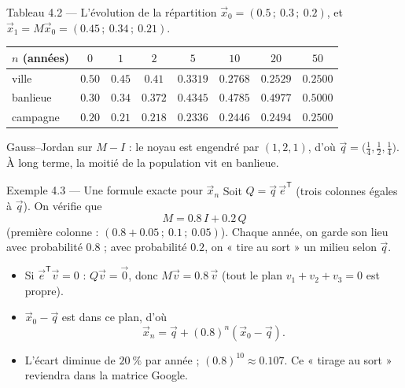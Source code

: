\begin{frame}{Tableau 4.2 --- L'évolution de la répartition}
  \small $\vec x_0=(\num{0.5}\,;\ \num{0.3}\,;\ \num{0.2})$, et
  $\vec x_1=M\vec x_0=(\num{0.45}\,;\ \num{0.34}\,;\ \num{0.21})$.
  \begin{center}
  \footnotesize
  \begin{tabular}{lccccccc}
    \toprule
    $n$ (années) & $0$ & $1$ & $2$ & $5$ & $10$ & $20$ & $50$ \\
    \midrule
    ville & $\num{0.50}$ & $\num{0.45}$ & $\num{0.41}$ & $\num{0.3319}$ & $\num{0.2768}$ & $\num{0.2529}$ & $\num{0.2500}$ \\
    banlieue & $\num{0.30}$ & $\num{0.34}$ & $\num{0.372}$ & $\num{0.4345}$ & $\num{0.4785}$ & $\num{0.4977}$ & $\num{0.5000}$ \\
    campagne & $\num{0.20}$ & $\num{0.21}$ & $\num{0.218}$ & $\num{0.2336}$ & $\num{0.2446}$ & $\num{0.2494}$ & $\num{0.2500}$ \\
    \bottomrule
  \end{tabular}
  \end{center}
  \small Gauss--Jordan sur $M-I$ : le noyau est engendré par $(1,2,1)$,
  d'où $\vec q=\big(\tfrac14,\tfrac12,\tfrac14\big)$. À long terme, la
  moitié de la population vit en banlieue.
\end{frame}

\begin{frame}{Exemple 4.3 --- Une formule exacte pour $\vec x_n$}
  \small Soit $Q=\vec q\,\vec e^{\mathsf T}$ (trois colonnes égales à
  $\vec q$). On vérifie que
  \[
    M = \num{0.8}\,I+\num{0.2}\,Q
  \]
  (première colonne : $(\num{0.8}+\num{0.05}\,;\ \num{0.1}\,;\ \num{0.05})$).
  Chaque année, on garde son lieu avec probabilité $\num{0.8}$ ; avec
  probabilité $\num{0.2}$, on « tire au sort » un milieu selon $\vec q$.
  \begin{itemize}
    \item Si $\vec e^{\mathsf T}\vec v=0$ : $Q\vec v=\vec0$, donc
      $M\vec v=\num{0.8}\,\vec v$ (tout le plan $v_1+v_2+v_3=0$ est
      propre).
    \item $\vec x_0-\vec q$ est dans ce plan, d'où
      \[
        \vec x_n = \vec q+(\num{0.8})^n(\vec x_0-\vec q).
      \]
    \item L'écart diminue de $\SI{20}{\percent}$ par année ;
      $(\num{0.8})^{10}\approx\num{0.107}$. Ce « tirage au sort »
      reviendra dans la matrice Google.
  \end{itemize}
\end{frame}

